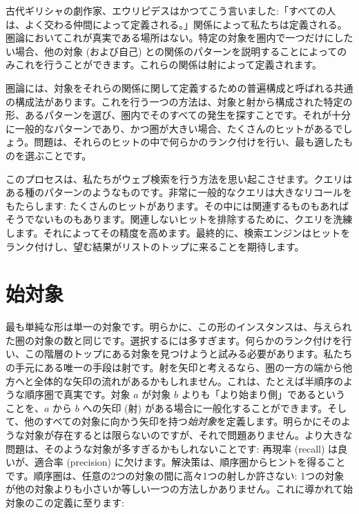 
\lettrine[lhang=0.17]{古}{代ギリシャ}の劇作家、エウリピデスはかつてこう言いました:「すべての人は、よく交わる仲間によって定義される。」関係によって私たちは定義される。圏論においてこれが真実である場所はない。特定の対象を圏内で一つだけにしたい場合、他の対象 (および自己) との関係のパターンを説明することによってのみこれを行うことができます。これらの関係は射によって定義されます。

圏論には、対象をそれらの関係に関して定義するための普遍構成と呼ばれる共通の構成法があります。これを行う一つの方法は、対象と射から構成された特定の形、あるパターンを選び、圏内でそのすべての発生を探すことです。それが十分に一般的なパターンであり、かつ圏が大きい場合、たくさんのヒットがあるでしょう。問題は、それらのヒットの中で何らかのランク付けを行い、最も適したものを選ぶことです。

このプロセスは、私たちがウェブ検索を行う方法を思い起こさせます。クエリはある種のパターンのようなものです。非常に一般的なクエリは大きなリコールをもたらします: たくさんのヒットがあります。その中には関連するものもあればそうでないものもあります。関連しないヒットを排除するために、クエリを洗練します。それによってその精度を高めます。最終的に、検索エンジンはヒットをランク付けし、望む結果がリストのトップに来ることを期待します。

\section{始対象}

最も単純な形は単一の対象です。明らかに、この形のインスタンスは、与えられた圏の対象の数と同じです。選択するには多すぎます。何らかのランク付けを行い、この階層のトップにある対象を見つけようと試みる必要があります。私たちの手元にある唯一の手段は射です。射を矢印と考えるなら、圏の一方の端から他方へと全体的な矢印の流れがあるかもしれません。これは、たとえば半順序のような順序圏で真実です。対象 $a$ が対象 $b$ よりも「より始まり側」であるということを、$a$ から $b$ への矢印 (射) がある場合に一般化することができます。そして、他のすべての対象に向かう矢印を持つ\emph{始対象}を定義します。明らかにそのような対象が存在するとは限らないのですが、それで問題ありません。より大きな問題は、そのような対象が多すぎるかもしれないことです: 再現率 (recall) は良いが、適合率 (precision) に欠けます。解決策は、順序圏からヒントを得ることです。順序圏は、任意の2つの対象の間に高々1つの射しか許さない: 1つの対象が他の対象よりも小さいか等しい一つの方法しかありません。これに導かれて始対象のこの定義に至ります:

